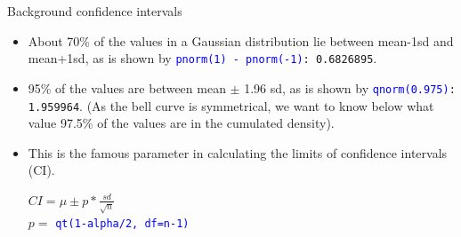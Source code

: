 \documentclass[xcolor=table,           xcolor=dvipsnames]{beamer}\usepackage[]{graphicx}\usepackage[]{color}
\newcommand{\rcode}[1]{\texttt{\textcolor{Blue}{#1}}} %
\begin{document}
\begin{frame}{Background confidence intervals}
\pause
\begin{itemize}[<+->]
  \item About 70\% of the values in a Gaussian distribution lie between mean-1sd and mean+1sd, as is shown by \rcode{pnorm(1) - pnorm(-1)}\texttt{: 0.6826895}.\\
  \item 95\% of the values are between mean $\pm$ 1.96 sd, as is shown by \rcode{qnorm(0.975)}\texttt{: 1.959964}. (As the bell curve is symmetrical, we want to know below what value 97.5\% of the values are in the cumulated density).\\
  \item This is the famous parameter in calculating the limits of confidence intervals (CI).
\begin{center}
$CI =  \mu \pm p*\frac{sd}{\sqrt{n}}$\\[1ex] %
$p = $ \rcode{qt(1-alpha/2,  df=n-1)}
\end{center}
\end{itemize}
\end{frame}
\end{document}
